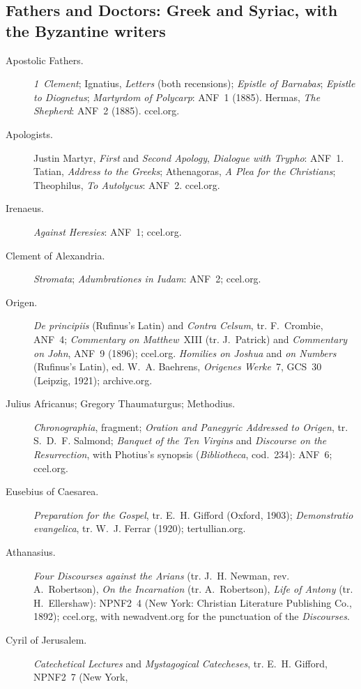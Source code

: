 \subsection*{Fathers and Doctors: Greek and Syriac, with the Byzantine writers}
\begin{description}
\item[Apostolic Fathers.] \emph{1~Clement}; Ignatius, \emph{Letters} (both
  recensions); \emph{Epistle of Barnabas}; \emph{Epistle to Diognetus};
  \emph{Martyrdom of Polycarp}: ANF~1 (1885). Hermas, \emph{The Shepherd}:
  ANF~2 (1885). ccel.org.
\item[Apologists.] Justin Martyr, \emph{First} and \emph{Second Apology},
  \emph{Dialogue with Trypho}: ANF~1. Tatian, \emph{Address to the
  Greeks}; Athenagoras, \emph{A Plea for the Christians}; Theophilus,
  \emph{To Autolycus}: ANF~2. ccel.org.
\item[Irenaeus.] \emph{Against Heresies}: ANF~1; ccel.org.
\item[Clement of Alexandria.] \emph{Stromata}; \emph{Adumbrationes in
  Iudam}: ANF~2; ccel.org.
\item[Origen.] \emph{De principiis} (Rufinus's Latin) and \emph{Contra
  Celsum}, tr. F.~Crombie, ANF~4; \emph{Commentary on Matthew}~XIII (tr.
  J.~Patrick) and \emph{Commentary on John}, ANF~9 (1896); ccel.org.
  \emph{Homilies on Joshua} and \emph{on Numbers} (Rufinus's Latin), ed.
  W.~A. Baehrens, \emph{Origenes Werke}~7, GCS~30 (Leipzig, 1921);
  archive.org.
\item[Julius Africanus; Gregory Thaumaturgus; Methodius.]
  \emph{Chronographia}, fragment; \emph{Oration and Panegyric Addressed to
  Origen}, tr. S.~D.~F. Salmond; \emph{Banquet of the Ten Virgins} and
  \emph{Discourse on the Resurrection}, with Photius's synopsis
  (\emph{Bibliotheca}, cod.~234): ANF~6; ccel.org.
\item[Eusebius of Caesarea.] \emph{Preparation for the Gospel}, tr.
  E.~H. Gifford (Oxford, 1903); \emph{Demonstratio evangelica}, tr.
  W.~J. Ferrar (1920); tertullian.org.
\item[Athanasius.] \emph{Four Discourses against the Arians} (tr.
  J.~H. Newman, rev. A.~Robertson), \emph{On the Incarnation} (tr.
  A.~Robertson), \emph{Life of Antony} (tr. H.~Ellershaw): NPNF2~4 (New
  York: Christian Literature Publishing Co., 1892); ccel.org, with
  newadvent.org for the punctuation of the \emph{Discourses}.
\item[Cyril of Jerusalem.] \emph{Catechetical Lectures} and
  \emph{Mystagogical Catecheses}, tr. E.~H. Gifford, NPNF2~7 (New York,

\end{description}
